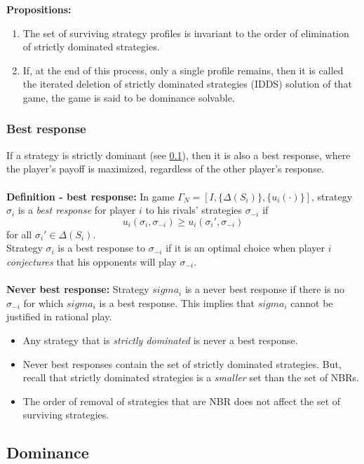 \documentclass{article}
\begin{document}
\noindent \textbf{Propositions:}
\begin{enumerate}
    \item The set of surviving strategy profiles is invariant to the order of elimination of strictly dominated strategies.
    \item If, at the end of this process, only a single profile remains, then it is called the iterated deletion of strictly dominated strategies (IDDS) solution of that game, the game is said to be dominance solvable.
\end{enumerate}

\subsubsection{Best response}
If a strategy is strictly dominant (see \ref{dom}), then it is also a best response, where the player's payoff is maximized, regardless of the other player's response. \\
\\
\noindent \textbf{Definition - best response:} In game \(\Gamma_N = [I, \{\Delta(S_i)\}, \{u_i(\cdot)\}]\), strategy \(\sigma_i\) is a \textit{best response} for player \(i\) to his rivals' strategies \(\sigma_{-i}\) if
\[
u_i(\sigma_i, \sigma_{-i}) \geq u_i(\sigma_i', \sigma_{-i})
\]
for all \(\sigma_i' \in \Delta(S_i)\).
\\
\noindent Strategy \(\sigma_i\) is a best response to \(\sigma_{-i}\) if it is an optimal choice when player \(i\) \textit{conjectures} that his opponents will play \(\sigma_{-i}\).
\\
\\
\noindent \textbf{Never best response:} Strategy $sigma_i$ is a never best response if there is no $\sigma_{-i}$ for which $sigma_i$ is a best response. This implies that $sigma_i$ cannot be justified in rational play. 
\begin{itemize}
    \item Any strategy that is \textit{strictly dominated} is never a best response.
    \item Never best responses contain the set of strictly dominated strategies. But, recall that strictly dominated strategies is a \textit{smaller} set than the set of NBRs. 
    \item The order of removal of strategies that are NBR does not affect the set of surviving strategies. 
\end{itemize}


\subsection{Dominance}\label{dom}
\end{document}
